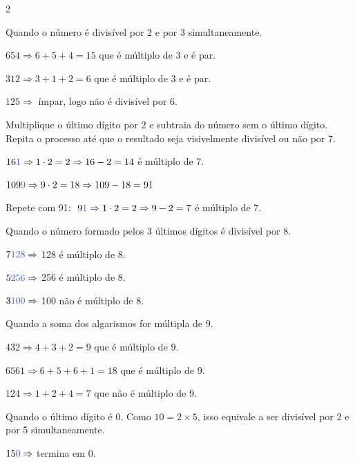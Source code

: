 \documentclass[12pt]{article}
\begin{document}
\begin{multicols}{2}

Quando o número é divisível por 2 e por 3 simultaneamente.


$654 \Rightarrow 6+5+4=15 $ que é múltiplo de 3 e é par.

$312 \Rightarrow 3+1+2=6 $ que é múltiplo de 3 e é par.

$125 \Rightarrow$ ímpar, logo não é divisível por 6.


Multiplique o último dígito por 2 e subtraia do número sem o último dígito. Repita o processo até que o resultado seja visivelmente divisível ou não por 7.


$16\textcolor{iris}{1} \Rightarrow 1 \cdot 2 = 2 \Rightarrow 16-2 = 14 $ é múltiplo de 7.

$109\textcolor{iris}{9} \Rightarrow 9 \cdot 2 = 18 \Rightarrow 109-18 = 91$

Repete com 91: $~9\textcolor{iris}{1} \Rightarrow 1 \cdot 2 = 2 \Rightarrow 9-2 = 7 $ é múltiplo de 7.


Quando o número formado pelos 3 últimos dígitos é divisível por 8.


$7\textcolor{iris}{128} \Rightarrow $ 128 é múltiplo de 8.

$5\textcolor{iris}{256} \Rightarrow $ 256 é múltiplo de 8.

$3\textcolor{iris}{100} \Rightarrow $ 100 não é múltiplo de 8.


Quando a soma dos algarismos for múltipla de 9.


$432 \Rightarrow 4+3+2 = 9 $ que é múltiplo de 9.

$6561 \Rightarrow 6+5+6+1 = 18 $ que é múltiplo de 9.

$124 \Rightarrow 1+2+4 = 7 $ que não é múltiplo de 9.


Quando o último dígito é 0. Como $10 = 2 \times 5$, isso equivale a ser divisível por 2 e por 5 simultaneamente.


$15\textcolor{iris}{0} \Rightarrow$ termina em 0.


\end{multicols}
\end{document}
